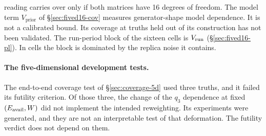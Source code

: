 reading carries over only if both matrices have 16 degrees of freedom. The model term $V_{\mathrm{prior}}$ of \S\ref{sec:fived16-cov} measures generator-shape model dependence. It is not a calibrated bound. Its coverage at truths held out of its construction has not been validated. The run-period block of the sixteen cells is $V_{\mathrm{run}}$ (\S\ref{sec:fived16-pl}). In cells  the block is dominated by the replica noise it contains.

\paragraph{The five-dimensional development tests.}
\label{rlim:5d}
The end-to-end coverage test of \S\ref{sec:coverage-5d} used three truths, and it failed its futility criterion. Of those three, the change of the $q_3$ dependence at fixed $(E_{\mathrm{avail}},W)$ did not implement the intended reweighting. Its experiments were generated, and they are not an interpretable test of that deformation. The futility verdict does not depend on them.

